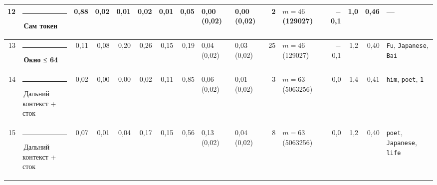 \documentclass[10pt]{article}
\begin{document}
\begin{minipage}{\linewidth}
\begin{center}
{\begin{tabular}{|r|l|r|r|r|r|r|r|l|l|r|l|r|r|r|l|}
12 & \textcolor[HTML]{2A78D6}{\rule{0.62em}{0.62em}}\,\textbf{Сам токен} & 0,88 & 0,02 & 0,01 & 0,02 & 0,01 & 0,05 & 0,00 (0,02) & 0,00 (0,02) & 2 & $m{=}46$ (129027) & $-$0,1 & 1,0 & 0,46 & — \\ \hline
13 & \textcolor[HTML]{EDA100}{\rule{0.62em}{0.62em}}\,\textbf{Окно ≤ 64} & 0,11 & 0,08 & 0,20 & 0,26 & 0,15 & 0,19 & 0,04 (0,02) & 0,03 (0,02) & 25 & $m{=}46$ (129027) & $-$0,1 & 1,2 & 0,40 & \texttt{\textvisiblespace{}Fu}, \texttt{\textvisiblespace{}Japanese}, \texttt{\textvisiblespace{}Bai} \\ \hline
14 & \textcolor[HTML]{C3C2B7}{\rule{0.62em}{0.62em}}\,Дальний контекст + сток & 0,02 & 0,00 & 0,00 & 0,02 & 0,11 & 0,85 & 0,06 (0,02) & 0,01 (0,02) & 3 & $m{=}63$ (5063256) & 0,0 & 1,4 & 0,41 & \texttt{\textvisiblespace{}him}, \texttt{\textvisiblespace{}poet}, \texttt{1} \\ \hline
15 & \textcolor[HTML]{C3C2B7}{\rule{0.62em}{0.62em}}\,Дальний контекст + сток & 0,07 & 0,01 & 0,04 & 0,17 & 0,15 & 0,56 & 0,13 (0,02) & 0,04 (0,02) & 8 & $m{=}63$ (5063256) & 0,0 & 1,2 & 0,40 & \texttt{\textvisiblespace{}poet}, \texttt{\textvisiblespace{}Japanese}, \texttt{\textvisiblespace{}life} \\ \hline
\hline\end{tabular}}\end{center}
\end{minipage}
\par\vspace{0.4em}
\end{document}
